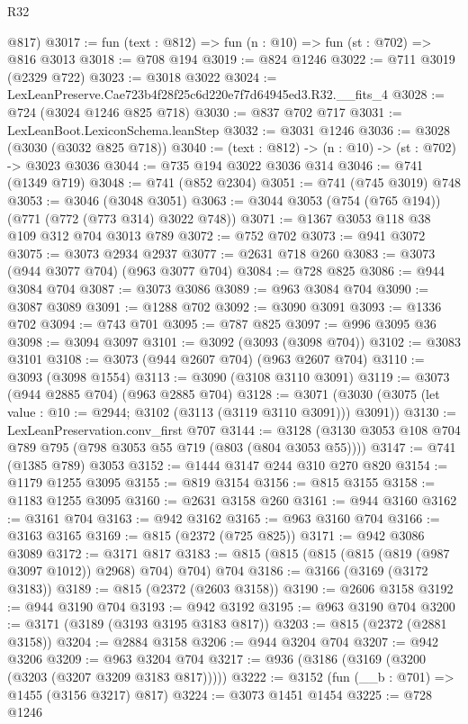 \begin{lexlean}{R32}
\begin{coremodule}
      @817)
@3017 := fun (text : @812) => fun (n : @10) => fun (st : @702) => @816 @3013
@3018 := @708 @194
@3019 := @824 @1246
@3022 := @711 @3019 (@2329 @722)
@3023 := @3018 @3022
@3024 := LexLeanPreserve.Cae723b4f28f25c6d220e7f7d64945ed3.R32.__fits_4
@3028 := @724 (@3024 @1246 @825 @718)
@3030 := @837 @702 @717
@3031 := LexLeanBoot.LexiconSchema.leanStep
@3032 := @3031 @1246
@3036 := @3028 (@3030 (@3032 @825 @718))
@3040 := (text : @812) -> (n : @10) -> (st : @702) -> @3023 @3036
@3044 := @735 @194 @3022 @3036 @314
@3046 := @741 (@1349 @719)
@3048 := @741 (@852 @2304)
@3051 := @741 (@745 @3019) @748
@3053 := @3046 (@3048 @3051)
@3063 := @3044 @3053 (@754 (@765 @194)) (@771 (@772 (@773 @314) @3022 @748))
@3071 := @1367 @3053 @118 @38 @109 @312 @704 @3013 @789
@3072 := @752 @702
@3073 := @941 @3072
@3075 := @3073 @2934 @2937
@3077 := @2631 @718 @260
@3083 := @3073 (@944 @3077 @704) (@963 @3077 @704)
@3084 := @728 @825
@3086 := @944 @3084 @704
@3087 := @3073 @3086
@3089 := @963 @3084 @704
@3090 := @3087 @3089
@3091 := @1288 @702
@3092 := @3090 @3091
@3093 := @1336 @702
@3094 := @743 @701
@3095 := @787 @825
@3097 := @996 @3095 @36
@3098 := @3094 @3097
@3101 := @3092 (@3093 (@3098 @704))
@3102 := @3083 @3101
@3108 := @3073 (@944 @2607 @704) (@963 @2607 @704)
@3110 := @3093 (@3098 @1554)
@3113 := @3090 (@3108 @3110 @3091)
@3119 := @3073 (@944 @2885 @704) (@963 @2885 @704)
@3128 := @3071 (@3030 (@3075 (let value : @10 := @2944; @3102 (@3113 (@3119 @3110 @3091))) @3091))
@3130 := LexLeanPreservation.conv_first @707
@3144 := @3128 (@3130 @3053 @108 @704 @789 @795 (@798 @3053 @55 @719 (@803 (@804 @3053 @55))))
@3147 := @741 (@1385 @789) @3053
@3152 := @1444 @3147 @244 @310 @270 @820
@3154 := @1179 @1255 @3095
@3155 := @819 @3154
@3156 := @815 @3155
@3158 := @1183 @1255 @3095
@3160 := @2631 @3158 @260
@3161 := @944 @3160
@3162 := @3161 @704
@3163 := @942 @3162
@3165 := @963 @3160 @704
@3166 := @3163 @3165
@3169 := @815 (@2372 (@725 @825))
@3171 := @942 @3086 @3089
@3172 := @3171 @817
@3183 := @815 (@815 (@815 (@815 (@819 (@987 @3097 @1012)) @2968) @704) @704) @704
@3186 := @3166 (@3169 (@3172 @3183))
@3189 := @815 (@2372 (@2603 @3158))
@3190 := @2606 @3158
@3192 := @944 @3190 @704
@3193 := @942 @3192
@3195 := @963 @3190 @704
@3200 := @3171 (@3189 (@3193 @3195 @3183 @817))
@3203 := @815 (@2372 (@2881 @3158))
@3204 := @2884 @3158
@3206 := @944 @3204 @704
@3207 := @942 @3206
@3209 := @963 @3204 @704
@3217 := @936 (@3186 (@3169 (@3200 (@3203 (@3207 @3209 @3183 @817)))))
@3222 := @3152 (fun (__b : @701) => @1455 (@3156 @3217) @817)
@3224 := @3073 @1451 @1454
@3225 := @728 @1246

\end{coremodule}
\end{lexlean}
